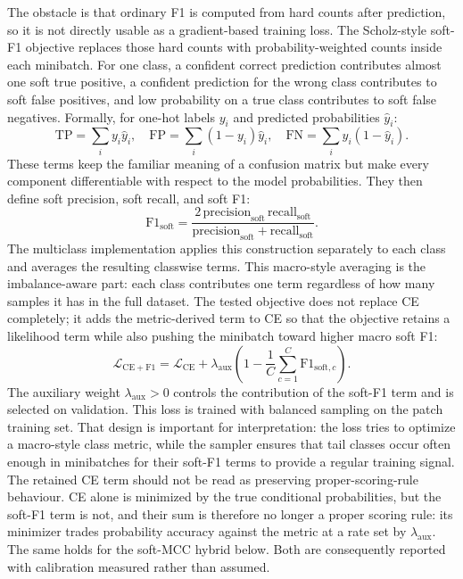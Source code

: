 \documentclass[11pt]{article}
\begin{document}
The obstacle is that ordinary F1 is computed from hard counts after prediction, so it is not directly usable as a gradient-based training loss. The Scholz-style soft-F1 objective replaces those hard counts with probability-weighted counts inside each minibatch. For one class, a confident correct prediction contributes almost one soft true positive, a confident prediction for the wrong class contributes to soft false positives, and low probability on a true class contributes to soft false negatives. Formally, for one-hot labels $y_i$ and predicted probabilities $\hat{y}_i$:
\begin{equation}
  \mathrm{TP}=\sum_i y_i\hat{y}_i,\quad
  \mathrm{FP}=\sum_i (1-y_i)\hat{y}_i,\quad
  \mathrm{FN}=\sum_i y_i(1-\hat{y}_i).
  \label{eq:soft-confusion-f1}
\end{equation}
\noindent These terms keep the familiar meaning of a confusion matrix but make every component differentiable with respect to the model probabilities. They then define soft precision, soft recall, and soft F1:
\begin{equation}
  \mathrm{F1}_{\mathrm{soft}} =
  \frac{2\,\mathrm{precision}_{\mathrm{soft}}\,\mathrm{recall}_{\mathrm{soft}}}
       {\mathrm{precision}_{\mathrm{soft}}+\mathrm{recall}_{\mathrm{soft}}}.
  \label{eq:soft-f1}
\end{equation}
\noindent The multiclass implementation applies this construction separately to each class and averages the resulting classwise terms. This macro-style averaging is the imbalance-aware part: each class contributes one term regardless of how many samples it has in the full dataset. The tested objective does not replace CE completely; it adds the metric-derived term to CE so that the objective retains a likelihood term while also pushing the minibatch toward higher macro soft F1:
\begin{equation}
  \mathcal{L}_{\mathrm{CE+F1}} = \mathcal{L}_{\mathrm{CE}} +
  \lambda_{\mathrm{aux}}
  \left(1-\frac{1}{C}\sum_{c=1}^{C}\mathrm{F1}_{\mathrm{soft},c}\right).
  \label{eq:ce-soft-f1}
\end{equation}
\noindent The auxiliary weight $\lambda_{\mathrm{aux}}>0$ controls the contribution of the soft-F1 term and is selected on validation. This loss is trained with balanced sampling on the patch training set. That design is important for interpretation: the loss tries to optimize a macro-style class metric, while the sampler ensures that tail classes occur often enough in minibatches for their soft-F1 terms to provide a regular training signal. The retained CE term should not be read as preserving proper-scoring-rule behaviour. CE alone is minimized by the true conditional probabilities, but the soft-F1 term is not, and their sum is therefore no longer a proper scoring rule: its minimizer trades probability accuracy against the metric at a rate set by $\lambda_{\mathrm{aux}}$. The same holds for the soft-MCC hybrid below. Both are consequently reported with calibration measured rather than assumed.
\end{document}

